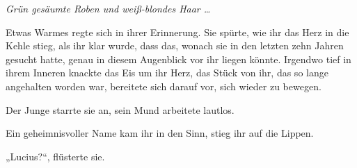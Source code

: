 \emph{Grün gesäumte Roben und weiß-blondes Haar …}

Etwas Warmes regte sich in ihrer Erinnerung. Sie spürte, wie ihr das Herz in die Kehle stieg, als ihr klar wurde, dass das, wonach sie in den letzten zehn Jahren gesucht hatte, genau in diesem Augenblick vor ihr liegen könnte. Irgendwo tief in ihrem Inneren knackte das Eis um ihr Herz, das Stück von ihr, das so lange angehalten worden war, bereitete sich darauf vor, sich wieder zu bewegen.

Der Junge starrte sie an, sein Mund arbeitete lautlos.

Ein geheimnisvoller Name kam ihr in den Sinn, stieg ihr auf die Lippen.

„Lucius?“, flüsterte sie.

